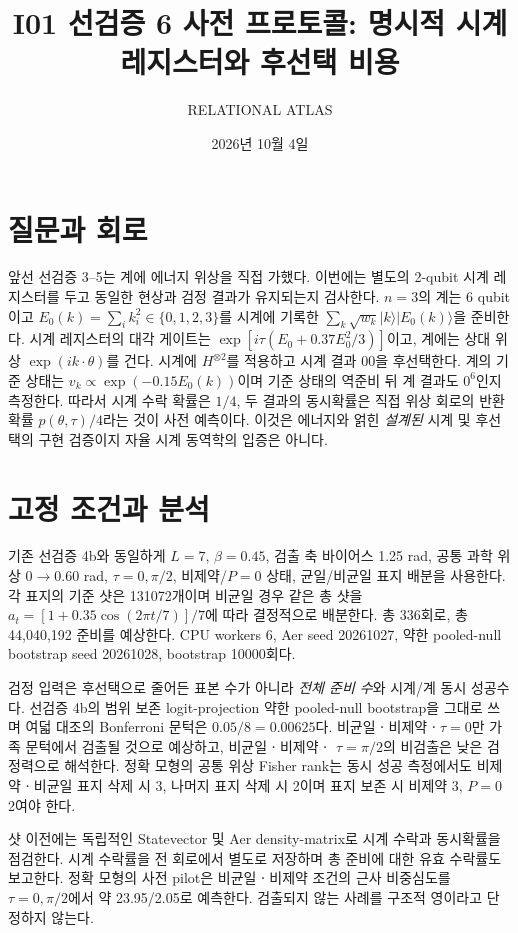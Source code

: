 \documentclass[11pt,a4paper]{article}
\title{I01 선검증 6 사전 프로토콜: 명시적 시계 레지스터와 후선택 비용}
\author{RELATIONAL ATLAS}
\date{2026년 10월 4일}
\begin{document}
\maketitle

\section{질문과 회로}
앞선 선검증 3--5는 계에 에너지 위상을 직접 가했다. 이번에는 별도의
2-qubit 시계 레지스터를 두고 동일한 현상과 검정 결과가 유지되는지
검사한다. $n=3$의 계는 6 qubit이고 $E_0(k)=\sum_i k_i^2\in
\{0,1,2,3\}$를 시계에 기록한
$\sum_k\sqrt{w_k}|k\rangle|E_0(k)\rangle$을 준비한다.
시계 레지스터의 대각 게이트는
$\exp[i\tau(E_0+0.37E_0^2/3)]$이고, 계에는 상대 위상
$\exp(i k\cdot\theta)$를 건다. 시계에 $H^{\otimes2}$를 적용하고
시계 결과 $00$을 후선택한다. 계의 기준 상태는
$v_k\propto\exp(-0.15 E_0(k))$이며 기준 상태의 역준비 뒤
계 결과도 $0^6$인지 측정한다. 따라서 시계 수락 확률은
$1/4$, 두 결과의 동시확률은 직접 위상 회로의 반환확률
$p(\theta,\tau)/4$라는 것이 사전 예측이다. 이것은 에너지와
얽힌 \emph{설계된} 시계 및 후선택의 구현 검증이지 자율 시계
동역학의 입증은 아니다.

\section{고정 조건과 분석}
기존 선검증 4b와 동일하게 $L=7$, $\beta=0.45$, 검출 축 바이어스
1.25 rad, 공통 과학 위상 $0\to0.60$ rad, $\tau=0,\pi/2$,
비제약/$P=0$ 상태, 균일/비균일 표지 배분을 사용한다. 각 표지의
기준 샷은 131072개이며 비균일 경우 같은 총 샷을
$a_t=[1+0.35\cos(2\pi t/7)]/7$에 따라 결정적으로 배분한다.
총 336회로, 총 44,040,192 준비를 예상한다. CPU workers 6,
Aer seed 20261027, 약한 pooled-null bootstrap seed 20261028,
bootstrap 10000회다.

검정 입력은 후선택으로 줄어든 표본 수가 아니라 \emph{전체 준비 수}와
시계/계 동시 성공수다. 선검증 4b의 범위 보존 logit-projection
약한 pooled-null bootstrap을 그대로 쓰며 여덟 대조의 Bonferroni
문턱은 $0.05/8=0.00625$다. 비균일ㆍ비제약ㆍ$\tau=0$만
가족 문턱에서 검출될 것으로 예상하고, 비균일ㆍ비제약ㆍ
$\tau=\pi/2$의 비검출은 낮은 검정력으로 해석한다. 정확 모형의
공통 위상 Fisher rank는 동시 성공 측정에서도 비제약ㆍ비균일
표지 삭제 시 3, 나머지 표지 삭제 시 2이며 표지 보존 시
비제약 3, $P=0$ 2여야 한다.

샷 이전에는 독립적인 Statevector 및 Aer density-matrix로
시계 수락과 동시확률을 점검한다. 시계 수락률을 전 회로에서
별도로 저장하며 총 준비에 대한 유효 수락률도 보고한다.
정확 모형의 사전 pilot은 비균일ㆍ비제약 조건의 근사 비중심도를
$\tau=0,\pi/2$에서 약 23.95/2.05로 예측한다.
검출되지 않는 사례를 구조적 영이라고 단정하지 않는다.
\end{document}
